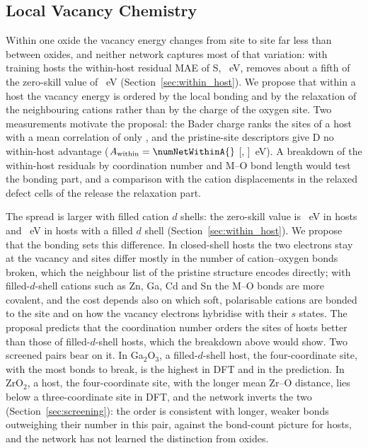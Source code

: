 \subsection{Local Vacancy Chemistry}
\label{sec:disc_site}

Within one oxide the vacancy energy changes from site to site far less than between oxides, and neither network captures most of that variation: with \numCfgBudgetsMax{} training hosts the within-host residual MAE of S, \numCOneCTwoVTwoMaeSixHundredFiftyFourSWithinHostMaeMean{}~eV, removes about a fifth of the zero-skill value of \numHostMeanOracleAggregateWithinHostMaeMean{}~eV (Section~\ref{sec:within_host}). We propose that within a host the vacancy energy is ordered by the local bonding and by the relaxation of the neighbouring cations rather than by the charge of the oxygen site. Two measurements motivate the proposal: the Bader charge ranks the sites of a host with a mean correlation of only \numWithinHostBreakdownSpearmanReferenceBaderChargeMean{}, and the pristine-site descriptors give D no within-host advantage ($A_\mathrm{within} = \numNetWithinA{}$ [\numNetWithinALo{}, \numNetWithinAHi{}]~eV). A breakdown of the within-host residuals by coordination number and M--O bond length would test the bonding part, and a comparison with the cation displacements in the relaxed defect cells of the release the relaxation part.

The spread is larger with filled cation $d$ shells: the zero-skill value is \numWithinHostBreakdownGroupsDClassDZeroVTwoSZeroSkillMaePoint{}~eV in \dzero{} hosts and \numWithinHostBreakdownGroupsDClassDTenVTwoSZeroSkillMaePoint{}~eV in hosts with a filled $d$ shell (Section~\ref{sec:within_host}). We propose that the bonding sets this difference. In closed-shell \dzero{} hosts the two electrons stay at the vacancy and sites differ mostly in the number of cation--oxygen bonds broken, which the neighbour list of the pristine structure encodes directly; with filled-$d$-shell cations such as Zn, Ga, Cd and Sn the M--O bonds are more covalent, and the cost depends also on which soft, polarisable cations are bonded to the site and on how the vacancy electrons hybridise with their $s$ states. The proposal predicts that the coordination number orders the sites of \dzero{} hosts better than those of filled-$d$-shell hosts, which the breakdown above would show. Two screened pairs bear on it. In Ga$_2$O$_3$, a filled-$d$-shell host, the four-coordinate site, with the most bonds to break, is the highest in DFT and in the prediction. In ZrO$_2$, a \dzero{} host, the four-coordinate site, with the longer mean Zr--O distance, lies below a three-coordinate site in DFT, and the network inverts the two (Section~\ref{sec:screening}): the order is consistent with longer, weaker bonds outweighing their number in this pair, against the bond-count picture for \dzero{} hosts, and the network has not learned the distinction from \numNetScreenBudget{} oxides.

